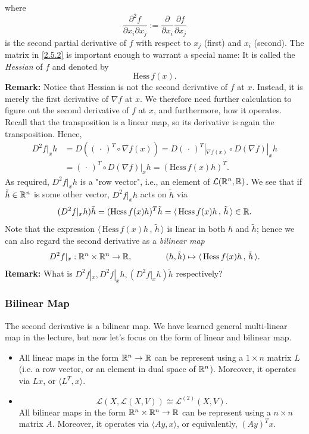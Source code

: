 \documentclass[11pt, t]{beamer}
\renewcommand{\emph}[1]{{\color{Turquoise3}\textsl{#1}}}
\newcommand{\scp}[2]{\langle\,#1\,,\,#2\,\rangle} \newcommand{\scpp}{\langle\,\cdot\,,\,\cdot\,\rangle}
\begin{document}
\begin{frame}[allowframebreaks]
    where
    \[\frac{\partial^2f}{\partial x_i\partial x_j}:=\frac{\partial}{\partial x_i}
        \frac{\partial f}{\partial x_j}\]
    is the second partial derivative of $f$ with respect to $x_j$ (first) and $x_i$ (second). The matrix in \eqref{2.5.2} is important enough to warrant a special name: It is called the \emph{Hessian} of $f$ and denoted by
    \[\text{Hess}\,f(x).\]
    \textbf{Remark:} Notice that Hessian is not the second derivative of $f$ at $x$. Instead, it is merely the first derivative of $\nabla f$ at $x$. We therefore need further calculation to figure out the second derivative of $f$ at $x$, and furthermore, how it operates.
    \newpage
    Recall that the transposition is a linear map, so its derivative is again the
    transposition. Hence,
    \begin{equation}\label{2.5.3}
        \begin{aligned}
            D^2f|_xh & =D((\,\cdot\,)^T\circ\nabla f(x))=D(\,\cdot\,)^T|_{\nabla f(x)}\circ D(\nabla f)|_xh \\
                     & =(\,\cdot\,)^T\circ D(\nabla f)|_xh=(\text{Hess}\,f(x)h)^T.
        \end{aligned}
    \end{equation}
    As required, $D^2f|_xh$ is a "row vector", i.e., an element of $\mathcal{L}(\mathbb{R}^n,\mathbb{R})$. We see that if $\tilde{h}\in\mathbb{R}^n$ is some other vector, $D^2f|_xh$ acts on $\tilde{h}$ via
    \[(D^2f|_xh)\tilde{h}=(\text{Hess}\,f(x)h)^T\tilde{h}
        =\scp{\text{Hess}\,f(x)h}{\tilde{h}}\in\R.\]
    Note that the expression $\scp{\text{Hess}\,f(x)h}{\tilde{h}}$ is linear in both $h$ and $\tilde{h}$; hence we can also regard the second derivative as a \emph{bilinear map}
    \[D^2f|_x:\R^n\times\R^n\to\R,\qquad\qquad
        (h,\tilde{h})\mapsto\scp{\text{Hess}\,f(x)h}{\tilde{h}}.\]
    \textbf{Remark:} What is $D^2f|_x, D^2f|_xh,(D^2f|_xh)\tilde{h}$ respectively?
\end{frame}

\begin{frame}
    \frametitle{Bilinear Map}
    The second derivative is a bilinear map. We have learned general multi-linear map in the lecture, but now let's focus on the form of linear and bilinear map.
    \begin{itemize}
        \item
              All linear maps in the form $\mathbb{R}^n\to\mathbb{R}$ can be represent using a $1\times n$ matrix $L$ (i.e. a row vector, or an element in dual space of $\mathbb{R}^n$). Moreover, it operates via $Lx$, or $\langle L^T,x \rangle$.
        \item
              \[\mathcal{L}(X,\mathcal{L}(X,V))\cong
                  \mathcal{L}^{(2)}(X,V).\]All bilinear maps in the form $\mathbb{R}^n\times\mathbb{R}^n\to \mathbb{R}$ can be represent using a $n\times n$ matrix $A$. Moreover, it operates via $\langle Ay,x \rangle$, or equivalently, $(Ay)^Tx$.
    \end{itemize}
\end{frame}
\end{document}
